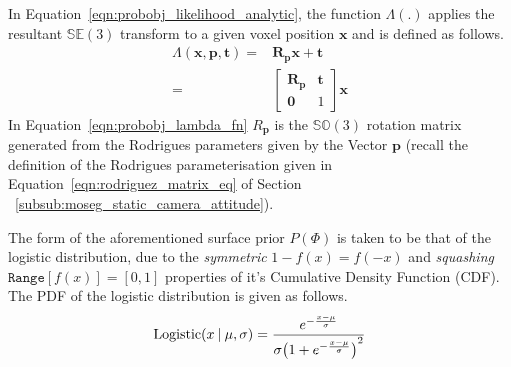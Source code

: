 In Equation~\ref{eqn:probobj_likelihood_analytic}, the function \(\Lambda(.)\)
applies the resultant \(\mathbb{SE}(3)\) transform to a given voxel position
\(\bm{x}\) and is defined as follows.
\begin{align}
  \label{eqn:probobj_lambda_fn}
  \Lambda(\bm{x}, \bm{p}, \bm{t}) ={}&
  \bm{R}_{\bm{p}} \bm{x} + \bm{t}\\
  ={}& 
  \begin{bmatrix}
    \bm{R}_{\bm{p}} & \bm{t} \\
    \bm{0} & 1
  \end{bmatrix}
  \bm{x}
\end{align}
In Equation~\ref{eqn:probobj_lambda_fn} \(R_{\bm{p}}\) is the \(\mathbb{SO}(3)\)
rotation matrix generated from the Rodrigues parameters given by the Vector
\(\bm{p}\) (recall the definition of the Rodrigues parameterisation given in
Equation~\ref{eqn:rodriguez_matrix_eq} of Section
~\ref{subsub:moseg_static_camera_attitude}).

The form of the aforementioned surface prior \(P(\Phi)\) is taken to be that of
the logistic distribution, due to the \textit{symmetric} \(1 - f(x) = f(-x)\)
and \textit{squashing} \(\texttt{Range}[f(x)] = [0, 1]\) properties of it's Cumulative
Density Function (CDF). The PDF of the logistic distribution is given as follows.
\begin{equation}
  \label{eqn:probobj_logistic_dist}
  \text{Logistic}(x \:\vert\: \mu, \sigma) = \frac
  {e^{-\frac{x - \mu}{\sigma}}}
  {\sigma {\big( 1 + e^{-\frac{x - \mu}{\sigma}} \big)}^{2}}
\end{equation}

